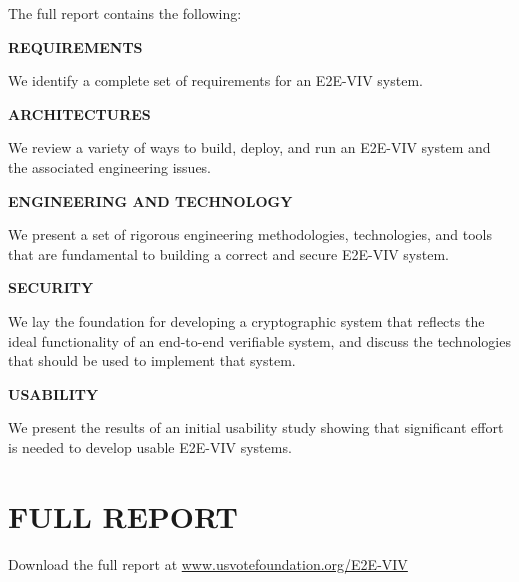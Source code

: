 The full report contains the following:

\noindent \textbf{REQUIREMENTS}

We identify a complete set of requirements for an E2E-VIV system.

\noindent \textbf{ARCHITECTURES}

We review a variety of ways to build, deploy, and run an E2E-VIV
system and the associated engineering issues.

\noindent \textbf{ENGINEERING AND TECHNOLOGY}

We present a set of rigorous engineering methodologies, technologies,
and tools that are fundamental to building a correct and secure
E2E-VIV system.

\noindent \textbf{SECURITY}

We lay the foundation for developing a cryptographic system that
reflects the ideal functionality of an end-to-end verifiable system,
and discuss the technologies that should be used to implement that
system.

\noindent \textbf{USABILITY}

We present the results of an initial usability study showing that
significant effort is needed to develop usable E2E-VIV systems.

\vspace{1cm}

\section*{FULL REPORT}

Download the full report at \url{www.usvotefoundation.org/E2E-VIV}
